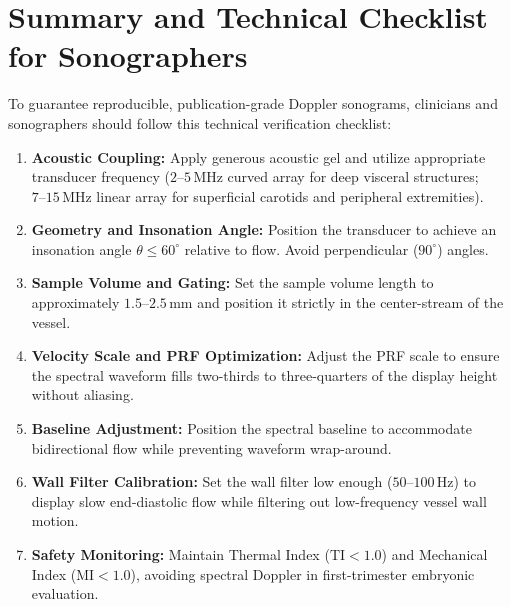 \documentclass[11pt,a4paper]{article}
\begin{document}
\section{Summary and Technical Checklist for Sonographers}

To guarantee reproducible, publication-grade Doppler sonograms, clinicians and sonographers should follow this technical verification checklist:
\begin{enumerate}[leftmargin=*]
    \item \textbf{Acoustic Coupling:} Apply generous acoustic gel and utilize appropriate transducer frequency ($2\text{--}5\,\text{MHz}$ curved array for deep visceral structures; $7\text{--}15\,\text{MHz}$ linear array for superficial carotids and peripheral extremities).
    \item \textbf{Geometry and Insonation Angle:} Position the transducer to achieve an insonation angle $\theta \le 60^\circ$ relative to flow. Avoid perpendicular ($90^\circ$) angles.
    \item \textbf{Sample Volume and Gating:} Set the sample volume length to approximately $1.5\text{--}2.5\,\text{mm}$ and position it strictly in the center-stream of the vessel.
    \item \textbf{Velocity Scale and PRF Optimization:} Adjust the PRF scale to ensure the spectral waveform fills two-thirds to three-quarters of the display height without aliasing.
    \item \textbf{Baseline Adjustment:} Position the spectral baseline to accommodate bidirectional flow while preventing waveform wrap-around.
    \item \textbf{Wall Filter Calibration:} Set the wall filter low enough ($50\text{--}100\,\text{Hz}$) to display slow end-diastolic flow while filtering out low-frequency vessel wall motion.
    \item \textbf{Safety Monitoring:} Maintain Thermal Index ($\text{TI} < 1.0$) and Mechanical Index ($\text{MI} < 1.0$), avoiding spectral Doppler in first-trimester embryonic evaluation.
\end{enumerate}
\end{document}
